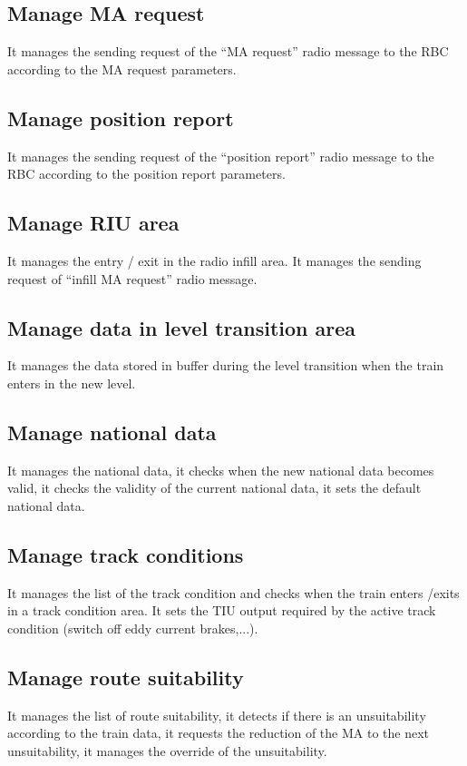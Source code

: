 \documentclass[nocc]{template/openetcs_report}
\begin{document}
\subsection{Manage MA request}
It manages the sending request of the "`MA request"' radio message to the RBC according to the MA request parameters.

\subsection{Manage position report}
It manages the sending request of the "`position report"' radio message to the RBC according to the position report parameters.

\subsection{Manage RIU area}
It manages the entry / exit in the radio infill area. It manages the sending request of "`infill MA request"' radio message.

\subsection{Manage data in level transition area}
It manages the data stored in buffer during the level transition when the train enters in the new level.

\subsection{Manage national data}
It manages the national data, it checks when the new national data becomes valid, it checks the validity of the current national data, it sets the default national data.

\subsection{Manage track conditions}
It manages the list of the track condition and checks when the train enters /exits in a track condition area. It sets the TIU output required by the active track condition (switch off eddy current brakes,...).

\subsection{Manage route suitability}
It manages the list of route suitability, it detects if there is an unsuitability according to the train data, it requests the reduction of the MA to the next unsuitability, it manages the override of the unsuitability.
\end{document}
